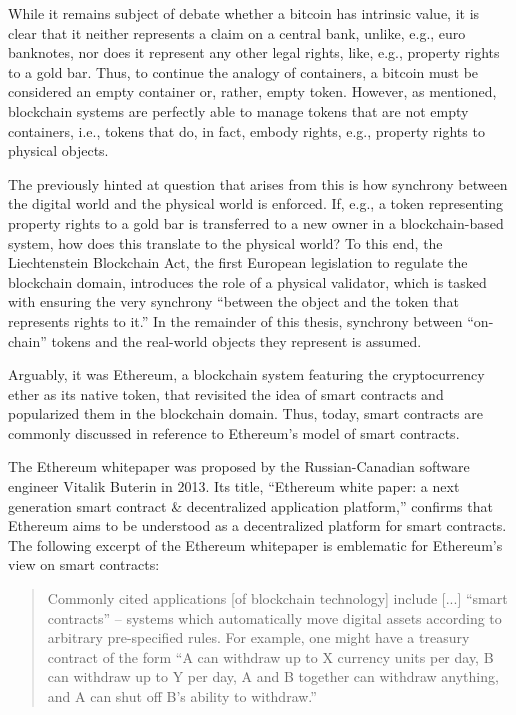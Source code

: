 While it remains subject of debate whether a bitcoin has intrinsic value, it is clear that it neither represents a claim on a central bank, unlike, e.g., euro banknotes, nor does it represent any other legal rights, like, e.g., property rights to a gold bar.
Thus, to continue the analogy of containers, a bitcoin must be considered an empty container or, rather, empty token.
However, as mentioned, blockchain systems are perfectly able to manage tokens that are not empty containers, i.e., tokens that do, in fact, embody rights, e.g., property rights to physical objects.

The previously hinted at question that arises from this is how synchrony between the digital world and the physical world is enforced.
If, e.g., a token representing property rights to a gold bar is transferred to a new owner in a blockchain-based system, how does this translate to the physical world?
To this end, the Liechtenstein Blockchain Act, the first European legislation to regulate the blockchain domain, introduces the role of a physical validator, which is tasked with ensuring the very synchrony ``between the object and the token that represents rights to it.'' \autocite[67]{naegele2019tvtg}
In the remainder of this thesis, synchrony between ``on-chain'' tokens and the real-world objects they represent is assumed.

Arguably, it was Ethereum, a blockchain system featuring the cryptocurrency ether as its native token, that revisited the idea of smart contracts and popularized them in the blockchain domain.
Thus, today, smart contracts are commonly discussed in reference to Ethereum's model of smart contracts.

The Ethereum whitepaper was proposed by the Russian-Canadian software engineer Vitalik Buterin in 2013. \autocite{blockchainlab2013ethereumwhitepaper, ethereum2021whitepaper}
Its title, ``Ethereum white paper: a next generation smart contract \& decentralized application platform,'' confirms that Ethereum aims to be understood as a decentralized platform for smart contracts.
The following excerpt of the Ethereum whitepaper is emblematic for Ethereum's view on smart contracts: \autocite[1]{blockchainlab2013ethereumwhitepaper}

\begin{quote}
	Commonly cited applications [of blockchain technology] include [...] ``smart contracts'' -- systems which automatically move digital assets according to arbitrary pre-specified rules.
	For example, one might have a treasury contract of the form ``A can withdraw up to X currency units per day, B can withdraw up to Y per day, A and B together can withdraw anything, and A can shut off B's ability to withdraw.''
\end{quote}

